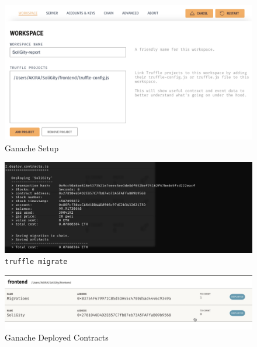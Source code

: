 \documentclass[12pt]{article}
\renewcommand{\_}{\kern-1.5pt\textunderscore\kern-1.5pt}
\begin{document}
\begin{figure}[H]
	\centering
	\includegraphics[width=13cm]{graphs/06. ganache_setup}
	\caption{Ganache Setup}
\end{figure}

\begin{figure}[H]
	\centering
	\includegraphics[width=13cm]{graphs/07. truffle_migrate}
	\caption{\texttt{truffle migrate}}
\end{figure}

\begin{figure}[H]
	\centering
	\includegraphics[width=13cm]{graphs/08. ganache_deployed_contract}
	\caption{Ganache Deployed Contracts}
\end{figure}




\end{document}
